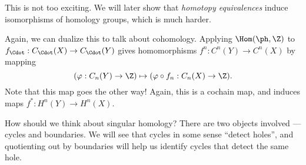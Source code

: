 \documentclass[a4paper]{article}
\begin{document}
This is not too exciting. We will later show that \emph{homotopy equivalences} induce isomorphisms of homology groups, which is much harder.

Again, we can dualize this to talk about cohomology. Applying $\Hom(\ph, \Z)$ to $f_{\Cdot}: C_{\Cdot}(X) \to C_{\Cdot}(Y)$ gives homomorphisms $f^n: C^n(Y) \to C^n(X)$ by mapping
\[
  (\varphi: C_n(Y) \to \Z) \mapsto (\varphi \circ f_n: C_n(X) \to \Z).
\]
Note that this map goes the other way! Again, this is a cochain map, and induces maps $f^*: H^n(Y) \to H^n(X)$.

How should we think about singular homology? There are two objects involved --- cycles and boundaries. We will see that cycles in some sense ``detect holes'', and quotienting out by boundaries will help us identify cycles that detect the same hole.
\end{document}
